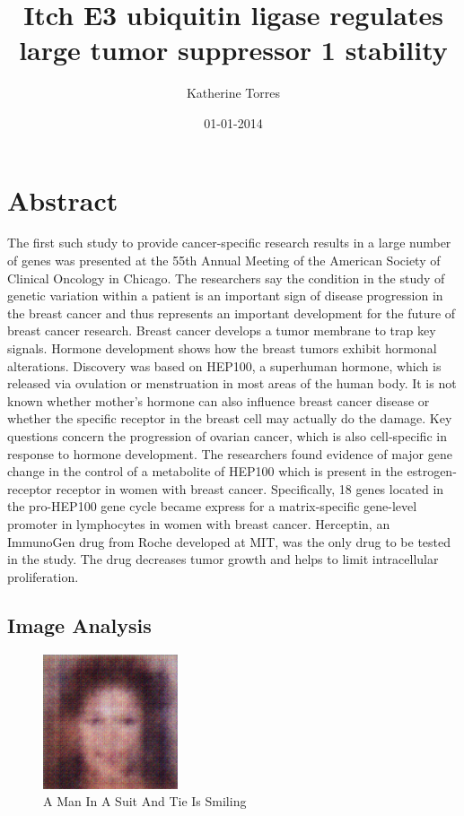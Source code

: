 \documentclass{article}%
\title{Itch E3 ubiquitin ligase regulates large tumor suppressor 1 stability}%
\author{Katherine Torres}%
\affil{National Creative Research Initiatives Center for Nuclear Receptor Signals, Hormone Research Center, School of Biological Sciences and Technology, Chonnam National University, Gwangju, Republic of Korea}%
\date{01{-}01{-}2014}%
\begin{document}
%
\normalsize%
\maketitle%
\section{Abstract}%
\label{sec:Abstract}%
The first such study to provide cancer{-}specific research results in a large number of genes was presented at the 55th Annual Meeting of the American Society of Clinical Oncology in Chicago. The researchers say the condition in the study of genetic variation within a patient is an important sign of disease progression in the breast cancer and thus represents an important development for the future of breast cancer research.\newline%
Breast cancer develops a tumor membrane to trap key signals.\newline%
Hormone development shows how the breast tumors exhibit hormonal alterations.\newline%
Discovery was based on HEP100, a superhuman hormone, which is released via ovulation or menstruation in most areas of the human body.\newline%
It is not known whether mother's hormone can also influence breast cancer disease or whether the specific receptor in the breast cell may actually do the damage.\newline%
Key questions concern the progression of ovarian cancer, which is also cell{-}specific in response to hormone development. The researchers found evidence of major gene change in the control of a metabolite of HEP100 which is present in the estrogen{-}receptor receptor in women with breast cancer. Specifically, 18 genes located in the pro{-}HEP100 gene cycle became express for a matrix{-}specific gene{-}level promoter in lymphocytes in women with breast cancer.\newline%
Herceptin, an ImmunoGen drug from Roche developed at MIT, was the only drug to be tested in the study. The drug decreases tumor growth and helps to limit intracellular proliferation.

%
\subsection{Image Analysis}%
\label{subsec:ImageAnalysis}%


\begin{figure}[h!]%
\centering%
\includegraphics[width=150px]{500_fake_images/samples_5_320.png}%
\caption{A Man In A Suit And Tie Is Smiling}%
\end{figure}

%
\end{document}
